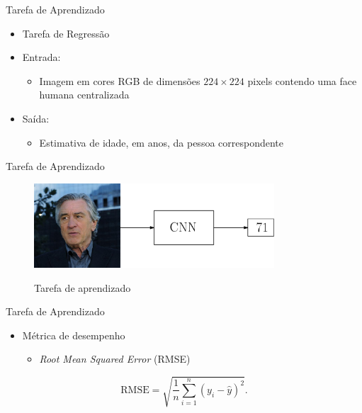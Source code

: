 \begin{frame}{Tarefa de Aprendizado}
\begin{itemize}
  \item Tarefa de Regressão
  \item \alert{Entrada}:
  \begin{itemize}
    \item Imagem em cores RGB de dimensões $224 \times 224$ pixels contendo uma face humana centralizada
  \end{itemize}
   \item \alert{Saída}:
   \begin{itemize}
        \item Estimativa de idade, em anos, da pessoa correspondente
   \end{itemize}
\end{itemize}
\end{frame}

\begin{frame}{Tarefa de Aprendizado}
  \begin{figure}[h!]
    \centering
       \caption{Tarefa de aprendizado}
       \includegraphics[width=0.8\textwidth]{img/deniro_cnn}
       \label{fig:deniro_cnn}
  \end{figure}
\end{frame}

\begin{frame}{Tarefa de Aprendizado}
     \begin{itemize}
          \item Métrica de desempenho
          \begin{itemize}
               \item \emph{Root Mean Squared Error} (RMSE)
          \end{itemize}
     \end{itemize}
     \begin{equation}\label{eq:rmse}
          \textrm{RMSE} = \sqrt{\frac{1}{n} \sum_{i=1}^n (y_i - \hat{y})^2}.
     \end{equation}
  \end{frame}

